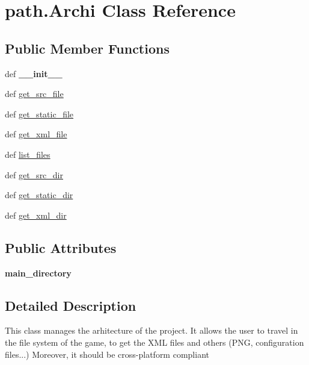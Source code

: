\hypertarget{classpath_1_1_archi}{\section{path.\-Archi \-Class \-Reference}
\label{classpath_1_1_archi}
}
\subsection*{\-Public \-Member \-Functions}
\begin{DoxyCompactItemize}
\item 
\hypertarget{classpath_1_1_archi_aa6df8d47c7300211ba330a8ad2c37e4d}{def {\bfseries \-\_\-\-\_\-init\-\_\-\-\_\-}}\label{classpath_1_1_archi_aa6df8d47c7300211ba330a8ad2c37e4d}

\item 
def \hyperlink{classpath_1_1_archi_a1dc5f761b2aa6edc73d9f08ab70ac098}{get\-\_\-src\-\_\-file}
\item 
def \hyperlink{classpath_1_1_archi_ac2bfc613455e4f2fbc1e6fb8062725a4}{get\-\_\-static\-\_\-file}
\item 
def \hyperlink{classpath_1_1_archi_a833a9e6f4fdc1970f641a0421659bd4b}{get\-\_\-xml\-\_\-file}
\item 
def \hyperlink{classpath_1_1_archi_af109944f278260b344c20fec9d63efcb}{list\-\_\-files}
\item 
def \hyperlink{classpath_1_1_archi_a86a72cf134364d99b09302a8acddc086}{get\-\_\-src\-\_\-dir}
\item 
def \hyperlink{classpath_1_1_archi_ab79ebbea6fec27a86d7512cc0b041a97}{get\-\_\-static\-\_\-dir}
\item 
def \hyperlink{classpath_1_1_archi_acd1b663ed5d2cce1bd0b46b834a9d4f5}{get\-\_\-xml\-\_\-dir}
\end{DoxyCompactItemize}
\subsection*{\-Public \-Attributes}
\begin{DoxyCompactItemize}
\item 
\hypertarget{classpath_1_1_archi_adc47f4b851130667d6ee16298dde6537}{{\bfseries main\-\_\-directory}}\label{classpath_1_1_archi_adc47f4b851130667d6ee16298dde6537}

\end{DoxyCompactItemize}


\subsection{\-Detailed \-Description}
\begin{DoxyVerb}
This class manages the arhitecture of the project.
It allows the user to travel in the file system of the game, to get
the XML files and others (PNG, configuration files...)
Moreover, it should be cross-platform compliant
\end{DoxyVerb}
 

